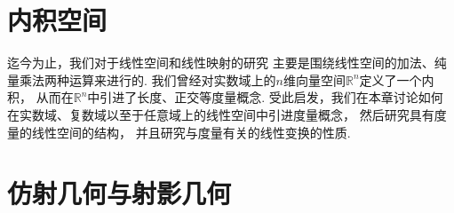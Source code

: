 \chapter{内积空间}
迄今为止，我们对于线性空间和线性映射的研究
主要是围绕线性空间的加法、纯量乘法两种运算来进行的.
我们曾经对实数域上的\(n\)维向量空间\(\mathbb{R}^n\)定义了一个内积，
从而在\(\mathbb{R}^n\)中引进了长度、正交等度量概念.
受此启发，我们在本章讨论如何在实数域、复数域以至于任意域上的线性空间中引进度量概念，
然后研究具有度量的线性空间的结构，
并且研究与度量有关的线性变换的性质.









\chapter{仿射几何与射影几何}


